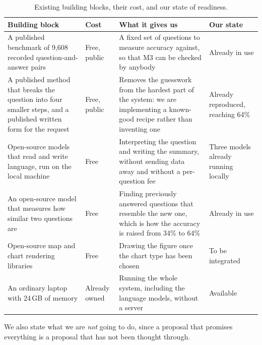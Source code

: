 \documentclass[12pt,a4paper]{report}
\begin{document}
\begin{table}[H]
  \centering
  \caption{Existing building blocks, their cost, and our state of readiness.}
  \label{tab:reuse}
  \begin{tabular}{@{}p{4.4cm}p{1.5cm}p{4.8cm}p{3.9cm}@{}}
    \toprule[1.5pt]
    \textbf{Building block} & \textbf{Cost} & \textbf{What it gives us} &
    \textbf{Our state} \\
    \midrule
    A published benchmark of 9{,}608 recorded question-and-answer pairs
      & Free, public &
      A fixed set of questions to measure accuracy against, so that M3 can be
      checked by anybody &
      Already in use \\
    \addlinespace
    A published method that breaks the question into four smaller steps, and a
      published written form for the request
      & Free, public &
      Removes the guesswork from the hardest part of the system: we are
      implementing a known-good recipe rather than inventing one &
      Already reproduced, reaching 64\% \\
    \addlinespace
    Open-source models that read and write language, run on the local machine
      & Free &
      Interpreting the question and writing the summary, without sending data
      away and without a per-question fee &
      Three models already running locally \\
    \addlinespace
    An open-source model that measures how similar two questions are
      & Free &
      Finding previously answered questions that resemble the new one, which is
      how the accuracy is raised from 34\% to 64\% &
      Already in use \\
    \addlinespace
    Open-source map and chart rendering libraries
      & Free &
      Drawing the figure once the chart type has been chosen &
      To be integrated \\
    \addlinespace
    An ordinary laptop with 24\,GB of memory
      & Already owned &
      Running the whole system, including the language models, without a
      server &
      Available \\
    \bottomrule[1.5pt]
  \end{tabular}
\end{table}

We also state what we are \emph{not} going to do, since a proposal that
promises everything is a proposal that has not been thought through.
\end{document}
